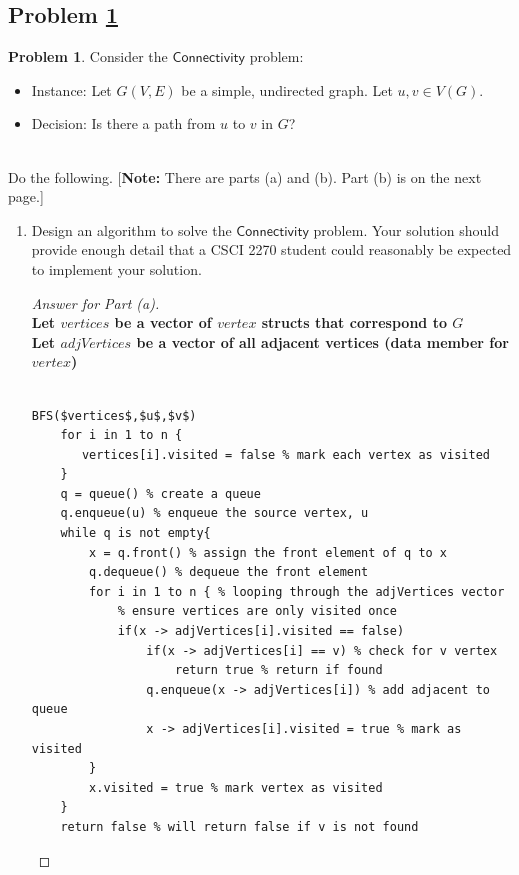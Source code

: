 \documentclass[11pt]{article}
\theoremstyle{definition}
\theoremstyle{definition}
\newtheorem{required}{Problem}
\theoremstyle{definition}
\begin{document}
\subsection{Problem \ref{DFS1}}
\begin{required} \label{DFS1}
Consider the $\textsf{Connectivity}$ problem:
\begin{itemize}
\item \textsf{Instance:} Let $G(V, E)$ be a simple, undirected graph. Let $u, v \in V(G)$.
\item \textsf{Decision:} Is there a path from $u$ to $v$ in $G$?
\end{itemize}

\noindent \\ Do the following. [\textbf{Note:} There are parts (a) and (b). Part (b) is on the next page.]
\begin{enumerate}[label=(\alph*)]
\item Design an algorithm to solve the $\textsf{Connectivity}$ problem. Your solution should provide enough detail that a CSCI 2270 student could reasonably be expected to implement your solution.
\begin{proof}[Answer for Part (a)] $ $ \\
\textbf{Let $vertices$ be a vector of $vertex$ structs that correspond to $G$} \\
\textbf{Let $adjVertices$ be a vector of all adjacent vertices (data member for $vertex$)} 
\begin{lstlisting}

BFS($vertices$,$u$,$v$)
    for i in 1 to n {
       vertices[i].visited = false % mark each vertex as visited
    }
    q = queue() % create a queue
    q.enqueue(u) % enqueue the source vertex, u 
    while q is not empty{ 
        x = q.front() % assign the front element of q to x
        q.dequeue() % dequeue the front element
        for i in 1 to n { % looping through the adjVertices vector
            % ensure vertices are only visited once 
            if(x -> adjVertices[i].visited == false) 
                if(x -> adjVertices[i] == v) % check for v vertex 
                    return true % return if found
                q.enqueue(x -> adjVertices[i]) % add adjacent to queue
                x -> adjVertices[i].visited = true % mark as visited
        }
        x.visited = true % mark vertex as visited
    }
    return false % will return false if v is not found
\end{lstlisting}
\end{proof}



\end{enumerate}
\end{required}
\end{document}
